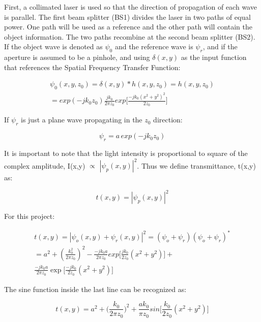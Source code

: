 \documentclass[12pt]{article}
\begin{document}
First, a collimated laser is used so that the direction of propagation of each wave is parallel. The first beam splitter (BS1) divides the laser in two paths of equal power. One path will be used as a reference and the other path will contain the object information. The two paths recombine at the second beam splitter (BS2). If the object wave is denoted as \(\psi_{0}\) and the reference wave is \(\psi_{r}\), and if the aperture is assumed to be a pinhole, and using \(\delta(x,y)\) as the input function that references the Spatial Frequency Transfer Function:

\begin{equation}
	\begin{multlined}
		\psi_{0}(x,y,z_{0}) = \delta(x,y) * h(x,y,z_{0}) = h(x,y,z_{0})
		\\= exp(-jk_{0}z_{0})\frac{jk_{0}}{2\pi z_{0}}exp\bigg[\frac{-jk_{0}(x^2 + y^2)^2}{2z_{0}}\bigg]
	\end{multlined}
\end{equation}

If \(\psi_{r}\) is just a plane wave propagating in the \(z_{0}\) direction:

\begin{equation}
	\psi_{r} = a\,exp(-jk_{0}z_{0})
\end{equation}

It is important to note that the light intensity is proportional to square of the complex amplitude, I(x,y) \(\propto\) \(|\psi_{p}(x,y)|^2\).
Thus we define transmittance, t(x,y) as:

\begin{equation}
	t(x,y) = |\psi_{p}(x,y)|^2
\end{equation}

For this project:

\begin{equation}
	\begin{multlined}
	t(x,y) = |\psi_{o}(x,y) + \psi_{r}(x,y)|^2
	=(\psi_{o} + \psi_{r})(\psi_{o} + \psi_{r})^*
	\\= a^2 + (\frac{k_{0}^2}{2\pi z_{0}})^2 - \frac{-jk_{0}a}{2\pi z_{0}}
	exp\bigg[ \frac{jk_{0}}{2z_{0}}(x^2 + y^2) \bigg] +
	\\\frac{-jk_{0}a}{2\pi z_{0}}
	\exp\bigg[\frac{-jk_{0}}{2z_{0}}(x^2 + y^2) \bigg]
	\end{multlined}
\end{equation}

The sine function inside the last line can be recognized as:

\begin{equation}
	t(x,y) = a^2 + \big(\frac{k_{0}}{2\pi z_{0}}\big)^2 +
	\frac{ak_{0}}{\pi z_{0}}sin\bigg[\frac{k_{0}}{2z_{0}}(x^2 + y^2)\bigg]
\end{equation}
\end{document}
